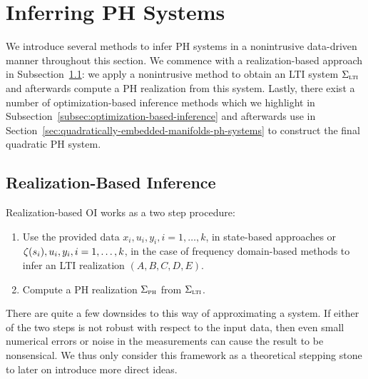 \section{Inferring \texorpdfstring{\ac{PH}}{PH} Systems}\label{sec:inferring-ph-systems}

We introduce several methods to infer \ac{PH} systems in a nonintrusive data-driven manner throughout this section.
We commence with a realization-based approach in Subsection~\ref{subsec:realization-based-inference}: we apply a nonintrusive method to obtain an \ac{LTI} system $\Sigma_{\textnormal{\scshape lti}}$ and afterwards compute a \ac{PH} realization from this system.
Lastly, there exist a number of optimization-based inference methods which we highlight in Subsection~\ref{subsec:optimization-based-inference} and afterwards use in Section~\ref{sec:quadratically-embedded-manifolds-ph-systems} to construct the final quadratic \ac{PH} system.

\subsection{Realization-Based Inference}\label{subsec:realization-based-inference}

Realization-based \ac{OI} works as a two step procedure:
\begin{enumerate}
    \item Use the provided data $x_i, u_i, y_i, i = 1, \dots, k$, in state-based approaches or $\zeta(s_i), u_i, y_i, i = 1, \dots, k$, in the case of frequency domain-based methods to infer an \ac{LTI} realization $(A, B, C, D, E)$.
    \item Compute a \ac{PH} realization $\Sigma_{\textnormal{\scshape ph}}$ from $\Sigma_{\textnormal{\scshape lti}}$.
\end{enumerate}
There are quite a few downsides to this way of approximating a system.
If either of the two steps is not robust with respect to the input data, then even small numerical errors or noise in the measurements can cause the result to be nonsensical.
We thus only consider this framework as a theoretical stepping stone to later on introduce more direct ideas.


